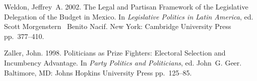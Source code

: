 \documentclass[letter,12pt]{article}
\begin{document}
\begin{thebibliography}{xx}
Weldon, Jeffrey~A. 2002.
\newblock The Legal and Partisan Framework of the Legislative Delegation of the
  Budget in {M}exico.  In {\em Legislative Politics in Latin America}, ed.
  Scott Morgenstern \harvardand\ Benito Nacif.
\newblock New York:  Cambridge University Press pp.~377--410.

Zaller, John. 1998.
\newblock Politicians as Prize Fighters: Electoral Selection and Incumbency
  Advantage.  In {\em Party Politics and Politicians}, ed. John~G. Geer.
\newblock Baltimore, MD:  Johns Hopkins University Press pp.~125--85.

\end{thebibliography}
\end{document}
